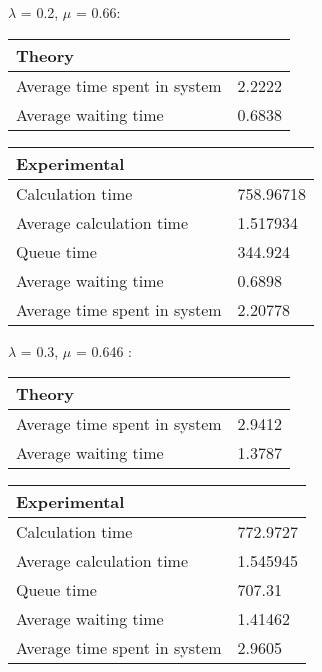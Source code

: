 \begin{minipage}{\linewidth}
    $\lambda$ = 0.2, $\mu$ = 0.66:

    \bigskip
    \begin{minipage}{0.45\linewidth}
        \begin{tabular}{|l|l|}
            \hline
            Theory & \\
            \hline
            Average time spent in system & 2.2222 \\
            Average waiting time & 0.6838 \\
            \hline
        \end{tabular}
    \end{minipage}
    \begin{minipage}{0.45\linewidth}
        \begin{tabular}{|l|l|}
            \hline
            Experimental & \\
            \hline
            Calculation time & 758.96718 \\
            Average calculation time & 1.517934 \\
            Queue time & 344.924 \\
            Average waiting time & 0.6898 \\
            Average time spent in system & 2.20778 \\
            \hline
        \end{tabular}
    \end{minipage}
    \bigskip
\end{minipage}

\begin{minipage}{\linewidth}
    $\lambda$ = 0.3, $\mu$ = 0.646 :

    \bigskip
    \begin{minipage}{0.45\linewidth}
        \begin{tabular}{|l|l|}
            \hline
            Theory & \\
            \hline
            Average time spent in system & 2.9412 \\
            Average waiting time & 1.3787 \\
            \hline
        \end{tabular}
    \end{minipage}
    \begin{minipage}{0.45\linewidth}
        \begin{tabular}{|l|l|}
            \hline
            Experimental & \\
            \hline
            Calculation time & 772.9727 \\
            Average calculation time & 1.545945 \\
            Queue time & 707.31 \\
            Average waiting time & 1.41462 \\
            Average time spent in system & 2.9605 \\
            \hline
        \end{tabular}
    \bigskip
    \end{minipage}
\end{minipage}

